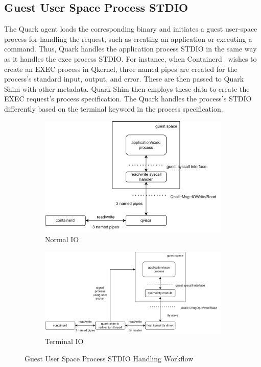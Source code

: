 \subsection{Guest User Space Process STDIO}
\label{sec:security_analyse_STDIO}

The Quark agent loads the corresponding binary and initiates a guest user-space process for handling the request, such as creating an application or executing a command. Thus, Quark handles the application process STDIO in the same way as it handles the exec process STDIO. For instance, when Containerd~\cite*{containerd} wishes to create an EXEC process in Qkernel, 
three named pipes are created for the process's standard input, output, and error. These are then passed to Quark Shim with other metadata. Quark Shim then employs these data to create the EXEC request's process specification. The Quark handles the process's STDIO differently based on the terminal keyword in the process specification.


\begin{figure}[ht] 
    \begin{subfigure}[b]{0.5\linewidth}
      \centering
      \includegraphics[width=0.9\linewidth]{images/normorl_io.png} 
      \caption{Normal IO} 
      \label{fig1:a} 
      \vspace{4ex}
    \end{subfigure}%
    \begin{subfigure}[b]{0.5\linewidth}
      \centering
      \includegraphics[width=0.9\linewidth]{images/termianl_workflow.png} 
      \caption{Terminal IO} 
      \label{fig1:b} 
      \vspace{4ex}
    \end{subfigure} 
    \caption{Guest User Space Process STDIO Handling Workflow}
    \label{fig1} 
\end{figure}



